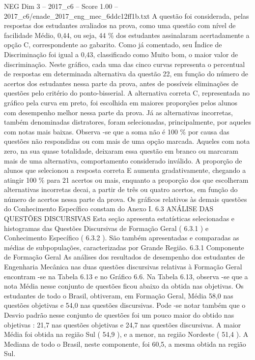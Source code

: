 \begin{textsample}{NEG Dim 3 – 2017\_c6 – Score 1.00 – 2017\_c6/enade\_2017\_eng\_mec\_6ddc12ff1b.txt}
A questão foi considerada, pelas respostas dos estudantes avaliados na prova, como uma questão com nível de facilidade Médio, 0,44, ou seja, 44 \% dos estudantes assinalaram acertadamente a opção C, correspondente ao gabarito.
Como já comentado, seu Índice de Discriminação foi igual a 0,43, classificado como Muito bom, o maior valor de discriminação.
Neste gráfico, cada uma das cinco curvas representa o percentual de respostas em determinada alternativa da questão 22, em função do número de acertos dos estudantes nessa parte da prova, antes de possíveis eliminações de questões pelo critério do ponto-bisserial.
A alternativa correta C, representada no gráfico pela curva em preto, foi escolhida em maiores proporções pelos alunos com desempenho melhor nessa parte da prova.
Já as alternativas incorretas, também denominadas distratores, foram selecionadas, principalmente, por aqueles com notas mais baixas.
Observa -se que a soma não é 100 \% por causa das questões não respondidas ou com mais de uma opção marcada.
Aqueles com nota zero, na sua quase totalidade, deixaram essa questão em branco ou marcaram mais de uma alternativa, comportamento considerado inválido.
A proporção de alunos que selecionou a resposta correta E aumenta gradativamente, chegando a atingir 100 \% para 21 acertos ou mais, enquanto a proporção dos que escolheram alternativas incorretas decai, a partir de três ou quatro acertos, em função do número de acertos nessa parte da prova.
Os gráficos relativos às demais questões do Conhecimento Específico constam do Anexo I. 6.3 ANÁLISE DAS QUESTÕES DISCURSIVAS Esta seção apresenta estatísticas selecionadas e histogramas das Questões Discursivas de Formação Geral ( 6.3.1 ) e Conhecimento Específico ( 6.3.2 ).
São também apresentadas e comparadas as médias de subpopulações, caracterizadas por Grande Região. 6.3.1 Componente de Formação Geral As análises dos resultados de desempenho dos estudantes de Engenharia Mecânica nas duas questões discursivas relativas à Formação Geral encontram -se na Tabela 6.13 e no Gráfico 6.6.
Na Tabela 6.13, observa -se que a nota Média nesse conjunto de questões ficou abaixo da obtida nas objetivas.
Os estudantes de todo o Brasil, obtiveram, em Formação Geral, Média 58,0 nas questões objetivas e 54,0 nas questões discursivas.
Pode -se notar também que o Desvio padrão nesse conjunto de questões foi um pouco maior do obtido nas objetivas : 21,7 nas questões objetivas e 24,7 nas questões discursivas.
A maior Média foi obtida na região Sul ( 54,9 ), e a menor, na região Nordeste ( 51,4 ).
A Mediana de todo o Brasil, neste componente, foi 60,5, a mesma obtida na região Sul.

\end{textsample}
